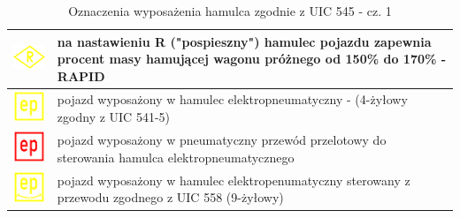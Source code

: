 \begin{table}
	\caption{Oznaczenia wyposażenia hamulca zgodnie z UIC 545 - cz. 1}
	\label{tab:opisyhamulca}
\begin{tabular}{|c|m{8cm}|}
	\hline
	\includegraphics[width=2.5cm]{skryptkierownik-img/symbol-uic-545-rapid.png} & na nastawieniu R ("pospieszny") hamulec pojazdu zapewnia procent masy hamującej wagonu próżnego od 150\% do 170\% - RAPID\\
	\hline 
	\includegraphics[width=2.5cm]{skryptkierownik-img/symbol-uic-545-ep.png}
	& pojazd wyposażony w hamulec elektropneumatyczny - (4-żyłowy zgodny z UIC 541-5)\\
	\hline
	\includegraphics[width=2.5cm]{skryptkierownik-img/symbol-uic-545-ep-cl.png}
	& pojazd wyposażony w pneumatyczny przewód przelotowy do sterowania hamulca elektropneumatycznego\\
	\hline
	\includegraphics[width=2.5cm]{skryptkierownik-img/symbol-uic-545-ep-remote.png}
	& pojazd wyposażony w hamulec elektropenumatyczny sterowany z przewodu zgodnego z UIC 558 (9-żyłowy)\\
	\hline
\end{tabular}
\end{table} 
